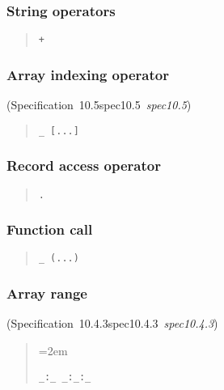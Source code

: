 \documentclass[10pt,b5paper]{article}
\def\specrefx#1#2{Specification~#1\ifx\relax#2\relax{}\else~{\it{}#2}\fi}
\def\specref#1{\specrefx{#1}{\csname spec#1\endcsname}}
\begin{document}
\subsubsection*{String operators}

\begin{quote}
\begin{verbatim}
+
\end{verbatim}
\end{quote}

\subsubsection*{Array indexing operator}
(\specref{10.5}\/)

\begin{quote}
\begin{verbatim}
_ [...]
\end{verbatim}
\end{quote}

\subsubsection*{Record access operator}

\begin{quote}
\begin{verbatim}
.
\end{verbatim}
\end{quote}

\subsubsection*{Function call}

\begin{quote}
\begin{verbatim}
_ (...)
\end{verbatim}
\end{quote}

\subsubsection*{Array range}
(\specref{10.4.3}\/)


\begin{quote}
\spaceskip=2em
\begin{verbatim}
_:_ _:_:_
\end{verbatim}
\end{quote}
\end{document}
